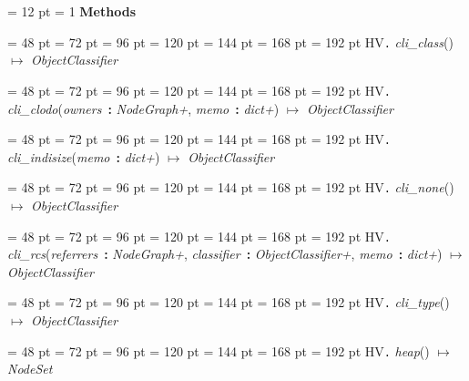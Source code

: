 {{{{{} \noindent
\par}
{\par \pagebreak[3.200000] \noindent \hangindent = 12 pt \hangafter = 1 
{\bf {\large {\bf Methods\/}}\/}\par}
{\par \noindent  \leftskip = 48 pt  \leftmargini = 72 pt  \leftmarginii = 96 pt  \leftmarginiii = 120 pt  \leftmarginiv = 144 pt  \leftmarginv = 168 pt  \leftmarginvi = 192 pt HV{\large {\tt .\/} {\em cli{\_}class\/}}() \(\mapsto \)  {\em ObjectClassifier\/}\par}
{\par \noindent  \leftskip = 48 pt  \leftmargini = 72 pt  \leftmarginii = 96 pt  \leftmarginiii = 120 pt  \leftmarginiv = 144 pt  \leftmarginv = 168 pt  \leftmarginvi = 192 pt HV{\large {\tt .\/} {\em cli{\_}clodo\/}}({\em owners\/}~{\bf :}  {\em NodeGraph+\/}, {\em memo\/}~{\bf :}  {\em dict+\/}) \(\mapsto \)  {\em ObjectClassifier\/}\par}
{\par \noindent  \leftskip = 48 pt  \leftmargini = 72 pt  \leftmarginii = 96 pt  \leftmarginiii = 120 pt  \leftmarginiv = 144 pt  \leftmarginv = 168 pt  \leftmarginvi = 192 pt HV{\large {\tt .\/} {\em cli{\_}indisize\/}}({\em memo\/}~{\bf :}  {\em dict+\/}) \(\mapsto \)  {\em ObjectClassifier\/}\par}
{\par \noindent  \leftskip = 48 pt  \leftmargini = 72 pt  \leftmarginii = 96 pt  \leftmarginiii = 120 pt  \leftmarginiv = 144 pt  \leftmarginv = 168 pt  \leftmarginvi = 192 pt HV{\large {\tt .\/} {\em cli{\_}none\/}}() \(\mapsto \)  {\em ObjectClassifier\/}\par}
{\par \noindent  \leftskip = 48 pt  \leftmargini = 72 pt  \leftmarginii = 96 pt  \leftmarginiii = 120 pt  \leftmarginiv = 144 pt  \leftmarginv = 168 pt  \leftmarginvi = 192 pt HV{\large {\tt .\/} {\em cli{\_}rcs\/}}({\em referrers\/}~{\bf :}  {\em NodeGraph+\/}, {\em classifier\/}~{\bf :}  {\em ObjectClassifier+\/}, {\em memo\/}~{\bf :}  {\em dict+\/}) \(\mapsto \)  {\em ObjectClassifier\/}\par}
{\par \noindent  \leftskip = 48 pt  \leftmargini = 72 pt  \leftmarginii = 96 pt  \leftmarginiii = 120 pt  \leftmarginiv = 144 pt  \leftmarginv = 168 pt  \leftmarginvi = 192 pt HV{\large {\tt .\/} {\em cli{\_}type\/}}() \(\mapsto \)  {\em ObjectClassifier\/}\par}
{\par \noindent  \leftskip = 48 pt  \leftmargini = 72 pt  \leftmarginii = 96 pt  \leftmarginiii = 120 pt  \leftmarginiv = 144 pt  \leftmarginv = 168 pt  \leftmarginvi = 192 pt HV{\large {\tt .\/} {\em heap\/}}() \(\mapsto \)  {\em NodeSet\/}\par}
}}}
